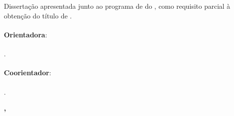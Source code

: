 %
%

\makeatletter
\begin{folhaderosto}
	\thispagestyle{empty}%
	
    \begin{center}
    
		\small\textbf{\expandafter\uppercase\expandafter{\imprimirnomeautor}}\\
		\vspace*{5.2 cm}%
		\normalsize\textbf{\expandafter\uppercase\expandafter{\imprimirtitulotb}}\\
		
    \end{center}
	
	\vspace*{2.35 cm}%
		    \large%
    		\hfill%
	    	\begin{minipage}{8 cm}%
	    		\begin{small} %
	    		\setlength{\baselineskip}{0.8\baselineskip}
				
				
		    	{Dissertação apresentada junto ao programa de {\textbf{\imprimirprograma}}
		    	do {\textbf{\imprimirinstituicao}},
		    	como requisito parcial à obtenção do título de
		    	{\textbf{\imprimirgrau}}.}\\{
		    	}\\\textbf{Orientadora}:\\ \\
		    	{\imprimirtitulacaoorientador }{ }{\imprimirorientador.}\\{
		    	}\\\textbf{Coorientador}:\\ \\ {\imprimirtitulacaocoorientador }{ }{\imprimircoorientador.}
				
				
				\end{small} %
		    \end{minipage}%
		    	
		    \vspace*{6.5 cm}%
		    
		    \begin{center} %
		    	\normalsize %
	    		\textbf{\imprimirlocalapresentacao, \imprimirdataapresentacao}
	    	\end{center}%

\end{folhaderosto}
\makeatother
